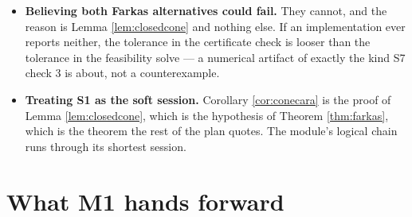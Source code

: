 \documentclass[11pt,a4paper]{article}
\theoremstyle{definition}
\theoremstyle{plain}
\theoremstyle{remark}
\begin{document}
\begin{itemize}
\item \textbf{Believing both Farkas alternatives could fail.} They cannot, and the reason is
Lemma \ref{lem:closedcone} and nothing else. If an implementation ever reports neither, the
tolerance in the certificate check is looser than the tolerance in the feasibility solve --- a
numerical artifact of exactly the kind S7 check 3 is about, not a counterexample.

\item \textbf{Treating S1 as the soft session.} Corollary \ref{cor:conecara} is the proof of
Lemma \ref{lem:closedcone}, which is the hypothesis of Theorem \ref{thm:farkas}, which is the
theorem the rest of the plan quotes. The module's logical chain runs through its shortest
session.
\end{itemize}

\section{What M1 hands forward}
\end{document}
